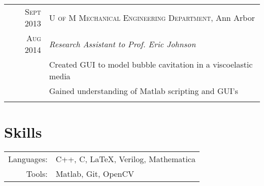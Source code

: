 \documentclass[a4paper,10pt]{article} %
\begin{document}

\begin{tabular}{r|p{13cm}}
\textsc{Sept 2013} & \textsc{U of M Mechanical Engineering Department}, Ann Arbor \\
\textsc{Aug 2014} & \emph{Research Assistant to Prof. Eric Johnson} \\
& \footnotesize{Created GUI to model bubble cavitation in a viscoelastic media} \\
& \footnotesize{Gained understanding of Matlab scripting and GUI's} \\
\multicolumn{2}{c}{} \\
\end{tabular}



\section{Skills}

\begin{tabular}{rl}
Languages: & C++, C, \LaTeX, Verilog, Mathematica \\
Tools: & Matlab, Git, OpenCV \\
\end{tabular}

\clearpage %
\end{document}
